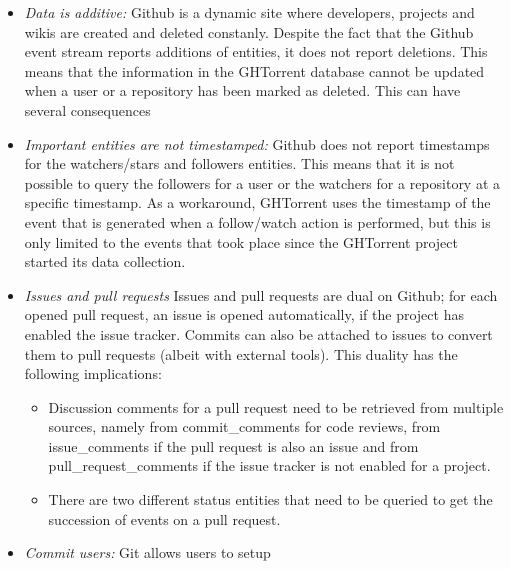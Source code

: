 \documentclass[conference]{IEEEtran}
\begin{document}
\begin{itemize}

  \item \emph{Data is additive:} Github is a dynamic site where developers, 
    projects and wikis are created and deleted constanly. Despite the fact
    that the Github event stream reports additions of entities, it does
    not report deletions. This means that the information in the GHTorrent 
    database cannot be updated when a user or a repository has been marked
    as deleted. This can have several consequences 

  \item \emph{Important entities are not timestamped:} Github does not report
    timestamps for the watchers/stars and followers entities. This means that it
    is not possible to query the followers for a user or the watchers for a
    repository at a specific timestamp. As a workaround, GHTorrent uses the
    timestamp of the event that is generated when a follow/watch action is
    performed, but this is only limited to the events that took place since
    the GHTorrent project started its data collection.

  \item \emph{Issues and pull requests} Issues and pull requests are dual on
    Github; for each opened pull request, an issue is opened automatically, if
    the project has enabled the issue tracker. Commits can also be attached to
    issues to convert them to pull requests (albeit with external tools). This
    duality has the following implications: 

    \begin{itemize}

      \item Discussion comments for a pull request need to be retrieved from
        multiple sources, namely from {\sf commit\_comments} for code reviews,
        from {\sf issue\_comments} if the pull request is also an issue and 
        from {\sf pull\_request\_comments} if the issue tracker is not enabled
        for a project.

      \item There are two different status entities that need to be queried to
        get the succession of events on a pull request.

    \end{itemize}

  \item \emph{Commit users:} Git allows users to setup  


\end{itemize}
\end{document}

